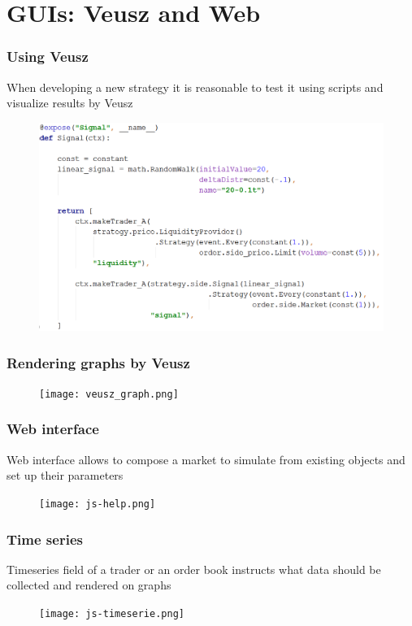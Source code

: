 \documentclass{beamer}
\begin{document}
\section{GUIs: Veusz and Web}
\begin{frame}
\frametitle{Using Veusz}
When developing a new strategy it is reasonable to test it using scripts and visualize results by Veusz
\begin{figure}[htbp]
\centering
\includegraphics[width=1\linewidth]{using_veusz_code.png}
\end{figure}
\end{frame}

\begin{frame}
\frametitle{Rendering graphs by Veusz}
\begin{figure}[htbp]
\centering
\texttt{[image: veusz\_graph.png]}
\end{figure}
\end{frame}


\begin{frame}
\frametitle{Web interface}
Web interface allows to compose a market to simulate from existing objects and set up their parameters
\begin{figure}[htbp]
\centering
\texttt{[image: js-help.png]}
\end{figure}
\end{frame}

\begin{frame}
\frametitle{Time series}
Timeseries field of a trader or an order book instructs what data should be collected and rendered on graphs
\begin{figure}[htbp]
\centering
\texttt{[image: js-timeserie.png]}
\end{figure}
\end{frame}
\end{document}
